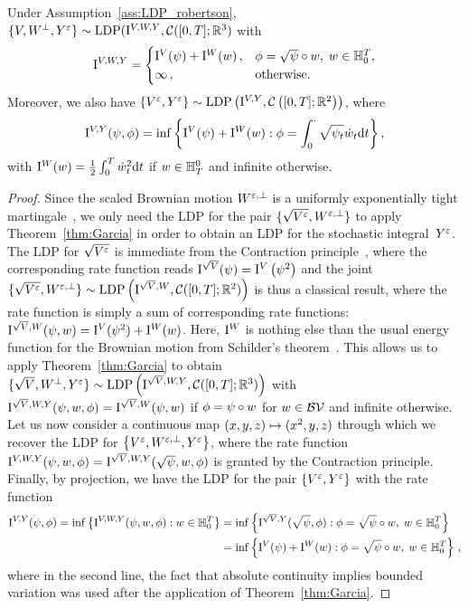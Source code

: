 \begin{theorem}\label{thm:garciaLDP}
Under Assumption~\ref{ass:LDP_robertson}, 
$\{V, W^\perp, Y^{\varepsilon}\}\sim\mathrm{LDP}(\mathrm{I}^{V, W, Y}, \mathcal{C}([0,T]; \mathbb{R}^3)$ with
\[
\mathrm{I}^{V,W,Y} = 
\begin{cases} \mathrm{I}^{V}(\psi) + \mathrm{I}^{W}(w)\,, & \phi=\sqrt\psi\circ w,\; w\in \mathbb{H}_0^T, \\
\infty\,, & \text{otherwise}.
\end{cases}
\]
Moreover, we also have
$\{V^{\varepsilon}, Y^{\varepsilon}\}\sim\mathrm{LDP}\left(\mathrm{I}^{V,Y},\mathcal{C}\left([0,T]; \mathbb{R}^2\right)\right)$, where
$$
\II^{V,Y}(\psi, \phi)=\inf \left\{\IIV(\psi) + \IIW(w): \phi = \int_{0}^{\cdot} \sqrt{\psi_{t}} \dot{w}_{t} \D t\right\}, %
$$
with
$\mathrm{I}^{W}(w) = \frac{1}{2} \int_{0}^{T} \dot{w}_{t}^{2} \mathrm{d} t$
if $w \in \mathbb{H}_{T}^{0}$ and infinite otherwise.
\end{theorem}
\begin{proof}
Since the scaled Brownian motion $W^{\varepsilon,\perp}$ is a uniformly exponentially tight martingale~\cite[Example~2.1]{Garcia2007AIntegrals}, we only need the LDP for the pair $\{\sqrt{V^\varepsilon}, W^{\varepsilon, \perp}\}$ to apply Theorem~\ref{thm:Garcia} in order to obtain an LDP for the stochastic integral~$Y^\varepsilon$. 
The LDP for $\sqrt{V^\varepsilon}$ is immediate from the Contraction principle~\cite[Theorem 4.2.1]{Dembo2010LargeApplications}, where the corresponding rate function reads $\mathrm{I}^{\sqrt{V}}(\psi) = \mathrm{I}^{V}\left(\psi^2\right)$ and the joint $\{\sqrt{V^{\varepsilon}}, W^{\varepsilon,\perp}\}\sim\mathrm{LDP}\left(\mathrm{I}^{\sqrt{V}, W}, \mathcal{C}([0,T]; \mathbb{R}^2)\right)$ is thus a classical result,
where the rate function is simply a sum of corresponding rate functions: $\mathrm{I}^{\sqrt{V}, W}(\psi, w)=\mathrm{I}^{V}(\psi^2) + \mathrm{I}^{W}(w)$. Here, $\mathrm{I}^{W}$ is nothing else than the usual energy function for the Brownian motion from Schilder's theorem~\cite{Schilder1966AsymptoticIntegrals}. This allows us to apply Theorem~\ref{thm:Garcia} to obtain $\{\sqrt{V}, W^\perp, Y^{\varepsilon}\}\sim\mathrm{LDP}\left(\mathrm{I}^{\sqrt{V}, W, Y}, \mathcal{C}([0,T]; \mathbb{R}^3)\right)$ with $\mathrm{I}^{\sqrt{V}, W, Y}(\psi, w, \phi) =\nobreak \mathrm{I}^{\sqrt{V}, W}(\psi, w)$ if $\phi=\nobreak\psi\circ w$ for $w\in\mathcal{BV}$ and infinite otherwise. Let us now consider a continuous map $(x,y,z) \mapsto\nobreak (x^2, y, z)$ through which we recover the LDP for $\left\{V^\varepsilon, W^{\varepsilon,\perp}, Y^\varepsilon\right\}$, where the rate function $\mathrm{I}^{V,W,Y}(\psi, w, \phi) =\nobreak \mathrm{I}^{\sqrt V,W,Y}(\sqrt\psi, w, \phi)$ is granted by the Contraction principle. Finally, by projection, we have the LDP for the pair $\{V^\varepsilon, Y^\varepsilon\}$ with the rate function
\begin{align*}
\mathrm{I}^{V,Y}(\psi,\phi) = \inf\left\{\mathrm{I}^{V,W,Y}(\psi, w, \phi): w\in \mathbb{H}_0^T\right\}
&= \inf\left\{\mathrm{I}^{\sqrt V,Y}(\sqrt\psi,\phi): \phi = \sqrt\psi\circ w,\; w\in \mathbb{H}_0^T\right\} \\ &= \inf\left\{\mathrm{I}^{V}(\psi) + \mathrm{I}^{W}(w): \phi=\sqrt\psi\circ w,\; w\in \mathbb{H}_0^T\right\}\,,
\end{align*}
where in the second line, the fact that absolute continuity implies bounded variation was used after the application of Theorem~\ref{thm:Garcia}.
\end{proof}
